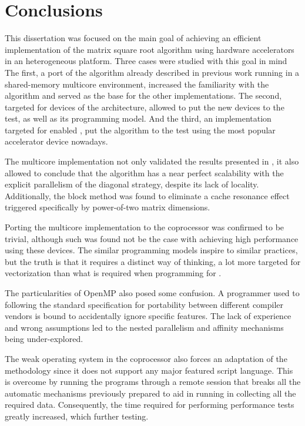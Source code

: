 \documentclass[../thesis]{subfiles}
\begin{document}
	\chapter{Conclusions}
	\label{chp:conclusions}

	This dissertation was focused on the main goal of achieving an efficient implementation of the matrix square root algorithm using hardware accelerators in an heterogeneous platform. Three cases were studied with this goal in mind The first, a port of the algorithm already described in previous work running in a shared-memory multicore environment, increased the familiarity with the algorithm and served as the base for the other implementations. The second, targeted for devices of the \intel\mic architecture, allowed to put the new \intel devices to the test, as well as its programming model. And the third, an implementation targeted for \cuda enabled \nvidia\gpus, put the algorithm to the test using the most popular accelerator device nowadays.

	The multicore implementation not only validated the results presented in \cite{Deadman:Higham:Ralha:2013}, it also allowed to conclude that the algorithm has a near perfect scalability with the explicit parallelism of the diagonal strategy, despite its lack of locality. Additionally, the block method was found to eliminate a cache resonance effect triggered specifically by power-of-two matrix dimensions.

	Porting the multicore implementation to the \intel\xeonphi coprocessor was confirmed to be trivial, although such was found not be the case with achieving high performance using these devices. The similar programming models inspire to similar practices, but the truth is that it requires a distinct way of thinking, a lot more targeted for vectorization than what is required when programming for \cpus.

	The particularities of \intel OpenMP also posed some confusion. A programmer used to following the standard specification for portability between different compiler vendors is bound to accidentally ignore \intel specific features. The lack of experience and wrong assumptions led to the nested parallelism and affinity mechanisms being under-explored.

	The weak operating system in the coprocessor also forces an adaptation of the methodology since it does not support any major featured script language. This is overcome by running the programs through a remote session that breaks all the automatic mechanisms previously prepared to aid in running in collecting all the required data. Consequently, the time required for performing performance tests greatly increased, which further testing.
\end{document}
